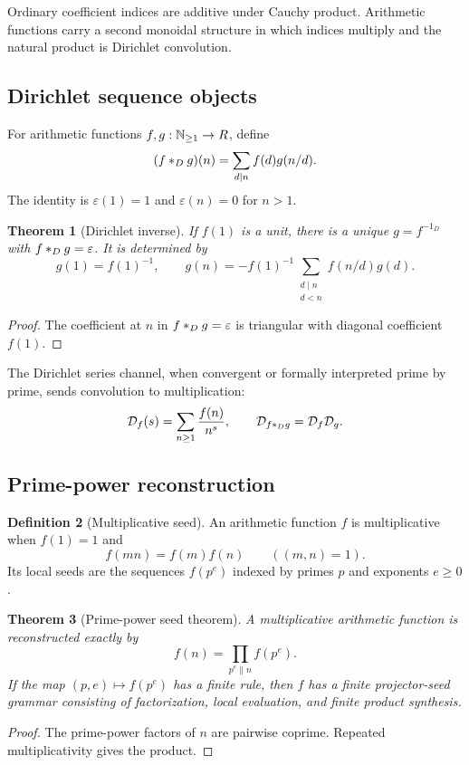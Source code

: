 \documentclass[11pt]{article}
\newtheorem{theorem}{Theorem}[section]\newtheorem{proposition}[theorem]{Proposition}\newtheorem{lemma}[theorem]{Lemma}\newtheorem{corollary}[theorem]{Corollary}
\theoremstyle{definition}\newtheorem{definition}[theorem]{Definition}\newtheorem{example}[theorem]{Example}\newtheorem{construction}[theorem]{Construction}\newtheorem{algorithm}[theorem]{Algorithm}\newtheorem{conjecture}[theorem]{Conjecture}\newtheorem{problem}[theorem]{Problem}
\theoremstyle{remark}\newtheorem{remark}[theorem]{Remark}\newtheorem{boundary}[theorem]{Boundary}\newtheorem{certificate}[theorem]{Computational Certificate}\newtheorem{classical}[theorem]{Classical Input}\newtheorem{principle}[theorem]{Structural Principle}
\begin{document}
Ordinary coefficient indices are additive under Cauchy product.  Arithmetic functions carry a second monoidal structure in which indices multiply and the natural product is Dirichlet convolution.

\subsection{Dirichlet sequence objects}
For arithmetic functions $f,g:\mathbb N_{\geq1}\to R$, define
\[
 (f\mathbin{\ast_D} g)(n)=\sum_{d\mid n}f(d)g(n/d).
\]
The identity is $\varepsilon(1)=1$ and $\varepsilon(n)=0$ for $n>1$.

\begin{theorem}[Dirichlet inverse]
If $f(1)$ is a unit, there is a unique $g=f^{-1_D}$ with $f\mathbin{\ast_D} g=\varepsilon$.  It is determined by
\[
 g(1)=f(1)^{-1},\qquad
 \boxed{g(n)=-f(1)^{-1}\sum_{\substack{d\mid n\\d<n}}f(n/d)g(d).}
\]
\end{theorem}
\begin{proof}
The coefficient at $n$ in $f\mathbin{\ast_D} g=\varepsilon$ is triangular with diagonal coefficient $f(1)$.
\end{proof}

The Dirichlet series channel, when convergent or formally interpreted prime by prime, sends convolution to multiplication:
\[
 \mathcal D_f(s)=\sum_{n\geq1}\frac{f(n)}{n^s},
 \qquad
 \mathcal D_{f\mathbin{\ast_D} g}=\mathcal D_f\mathcal D_g.
\]

\subsection{Prime-power reconstruction}
\begin{definition}[Multiplicative seed]
An arithmetic function $f$ is multiplicative when $f(1)=1$ and
\[
 f(mn)=f(m)f(n)\qquad((m,n)=1).
\]
Its local seeds are the sequences $f(p^e)$ indexed by primes $p$ and exponents $e\geq0$.
\end{definition}

\begin{theorem}[Prime-power seed theorem]
A multiplicative arithmetic function is reconstructed exactly by
\[
 \boxed{f(n)=\prod_{p^e\parallel n}f(p^e).}
\]
If the map $(p,e)\mapsto f(p^e)$ has a finite rule, then $f$ has a finite projector-seed grammar consisting of factorization, local evaluation, and finite product synthesis.
\end{theorem}
\begin{proof}
The prime-power factors of $n$ are pairwise coprime.  Repeated multiplicativity gives the product.
\end{proof}
\end{document}
